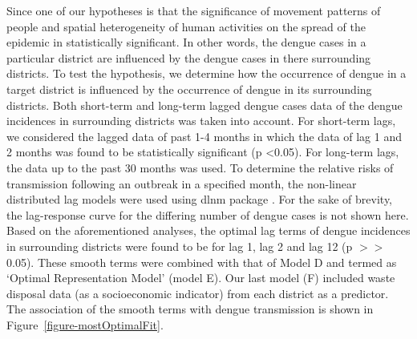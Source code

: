 \documentclass{bmcart}
\begin{document}
Since one of our hypotheses is that the significance of movement patterns of people and spatial heterogeneity of human activities on the spread of the epidemic in statistically significant. In other words, the dengue cases in a particular district are influenced by the dengue cases in there surrounding districts. To test the hypothesis, we determine how the occurrence of dengue in a target district is influenced by the occurrence of dengue in its surrounding districts. Both short-term and long-term lagged dengue cases data of the dengue incidences in surrounding districts was taken into account. For short-term lags, we considered the lagged data of past 1-4 months in which the data of lag 1 and 2 months was found to be statistically significant (p \textless 0.05). For long-term lags, the data up to the past 30 months was used. To determine the relative risks of transmission following an outbreak in a specified month, the non-linear distributed lag models were used using dlnm package \cite{gasparrini2011distributed}. For the sake of brevity, the lag-response curve for the differing number of dengue cases is not shown here. Based on the aforementioned analyses, the optimal lag terms of dengue incidences in surrounding districts were found to be for lag 1, lag 2 and lag 12 (p \(>\!\!>\) 0.05).  These smooth terms were combined with that of Model D and termed as `Optimal Representation Model' (model E). Our last model (F) included waste disposal data (as a socioeconomic indicator) from each district as a predictor. The association of the smooth terms with dengue transmission is shown in Figure~\ref{figure-mostOptimalFit}. 

\end{document}
